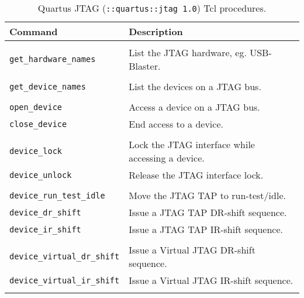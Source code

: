 \documentclass[10pt,twoside]{article}
\begin{document}
\clearpage
\begin{table}[p]
\caption{Quartus JTAG ({\tt ::quartus::jtag 1.0}) Tcl procedures.}
\label{tab:quartus_jtag}
\begin{center}
\begin{tabular}{|l|p{9cm}|}
\hline
Command & Description\\
\hline\hline
&\\
\verb+get_hardware_names+ & List the JTAG hardware, eg. USB-Blaster.\\
&\\
\verb+get_device_names+ & List the devices on a JTAG bus.\\
&\\
\verb+open_device+ & Access a device on a JTAG bus.\\
\verb+close_device+ & End access to a device.\\
&\\
\verb+device_lock+   & Lock the JTAG interface while accessing a device.\\
\verb+device_unlock+ & Release the JTAG interface lock.\\
&\\
\verb+device_run_test_idle+ & Move the JTAG TAP to run-test/idle.\\
\verb+device_dr_shift+      & Issue a JTAG TAP DR-shift sequence.\\
\verb+device_ir_shift+      & Issue a JTAG TAP IR-shift sequence.\\
&\\
\verb+device_virtual_dr_shift+ & Issue a Virtual JTAG DR-shift sequence.\\
\verb+device_virtual_ir_shift+ & Issue a Virtual JTAG IR-shift sequence.\\
&\\
\hline
\end{tabular}
\end{center}
\end{table}
\end{document}
